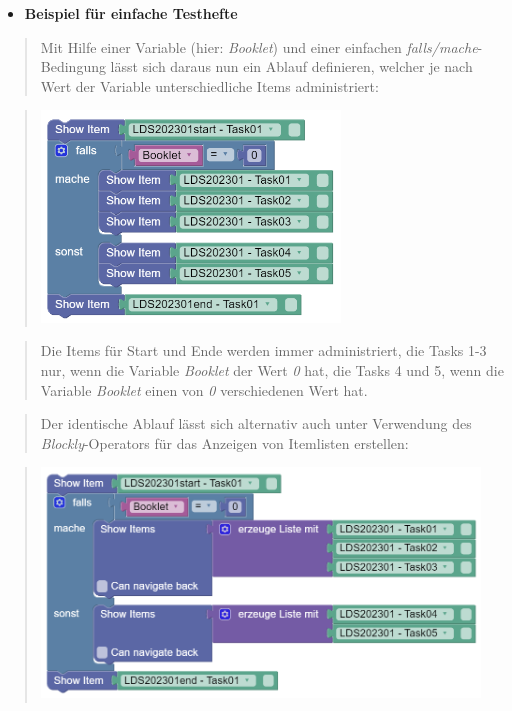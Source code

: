 \documentclass[
  letterpaper,
  DIV=11]{scrreprt}
\providecommand{\tightlist}{%
  \setlength{\itemsep}{0pt}\setlength{\parskip}{0pt}}\usepackage{longtable,booktabs,array}
\begin{document}
\begin{tcolorbox}
\begin{itemize}
\tightlist
\item
  \textbf{Beispiel für einfache Testhefte}
\end{itemize}

\begin{quote}
Mit Hilfe einer Variable (hier: \emph{Booklet}) und einer einfachen
\emph{falls/mache}-Bedingung lässt sich daraus nun ein Ablauf
definieren, welcher je nach Wert der Variable unterschiedliche Items
administriert:
\end{quote}

\begin{quote}
\includegraphics[width=3.125in,height=\textheight]{img/screenshot-show-items-lds2003-01-example-two-booklets-DEU.png}
\end{quote}

\begin{quote}
Die Items für Start und Ende werden immer administriert, die Tasks 1-3
nur, wenn die Variable \emph{Booklet} der Wert \emph{0} hat, die Tasks 4
und 5, wenn die Variable \emph{Booklet} einen von \emph{0} verschiedenen
Wert hat.
\end{quote}

\begin{quote}
Der identische Ablauf lässt sich alternativ auch unter Verwendung des
\emph{Blockly}-Operators für das Anzeigen von Itemlisten erstellen:
\end{quote}

\begin{quote}
\includegraphics[width=4.58333in,height=\textheight]{img/screenshot-show-items-lds2003-01-example-two-booklets-with-lists-DEU.png}
\end{quote}


\end{tcolorbox}
\end{document}
